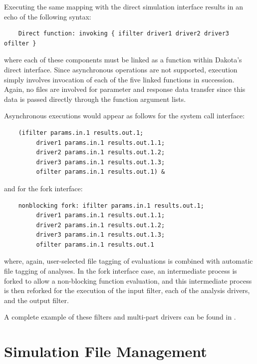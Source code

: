 Executing the same mapping with the direct simulation interface
results in an echo of the following syntax:
\begin{small}
\begin{verbatim}
    Direct function: invoking { ifilter driver1 driver2 driver3 ofilter }
\end{verbatim}
\end{small}

where each of these components must be linked as a function within
Dakota's direct interface. Since asynchronous operations are not
supported, execution simply involves invocation of each of the five
linked functions in succession. Again, no files are involved for
parameter and response data transfer since this data is passed
directly through the function argument lists.

Asynchronous executions would appear as follows for the system call
interface:
\begin{small}
\begin{verbatim}
    (ifilter params.in.1 results.out.1;
         driver1 params.in.1 results.out.1.1;
         driver2 params.in.1 results.out.1.2;
         driver3 params.in.1 results.out.1.3;
         ofilter params.in.1 results.out.1) &
\end{verbatim}
\end{small}

and for the fork interface:
\begin{small}
\begin{verbatim}
    nonblocking fork: ifilter params.in.1 results.out.1;
         driver1 params.in.1 results.out.1.1;
         driver2 params.in.1 results.out.1.2;
         driver3 params.in.1 results.out.1.3;
         ofilter params.in.1 results.out.1
\end{verbatim}
\end{small}

where, again, user-selected file tagging of evaluations is combined
with automatic file tagging of analyses. In the fork interface case,
an intermediate process is forked to allow a non-blocking function
evaluation, and this intermediate process is then reforked for the
execution of the input filter, each of the analysis drivers, and the
output filter.

A complete example of these filters and multi-part drivers can be
found in .

\section{Simulation File Management}\label{interfaces:file}

